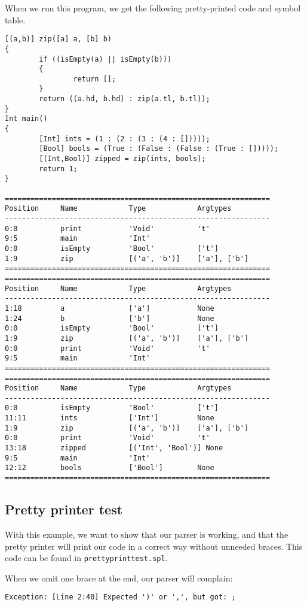 \documentclass[a4paper]{article}
\begin{document}
When we run this program, we get the following pretty-printed code and symbol table.
\begin{verbatim}
[(a,b)] zip([a] a, [b] b)
{
        if ((isEmpty(a) || isEmpty(b)))
        {
                return [];
        }
        return ((a.hd, b.hd) : zip(a.tl, b.tl));
}
Int main()
{
        [Int] ints = (1 : (2 : (3 : (4 : []))));
        [Bool] bools = (True : (False : (False : (True : []))));
        [(Int,Bool)] zipped = zip(ints, bools);
        return 1;
}

==============================================================
Position     Name            Type            Argtypes            
--------------------------------------------------------------
0:0          print           'Void'          't'                 
9:5          main            'Int'                               
0:0          isEmpty         'Bool'          ['t']               
1:9          zip             [('a', 'b')]    ['a'], ['b']        
==============================================================
==============================================================
Position     Name            Type            Argtypes            
--------------------------------------------------------------
1:18         a               ['a']           None                
1:24         b               ['b']           None                
0:0          isEmpty         'Bool'          ['t']               
1:9          zip             [('a', 'b')]    ['a'], ['b']        
0:0          print           'Void'          't'                 
9:5          main            'Int'                               
==============================================================
==============================================================
Position     Name            Type            Argtypes            
--------------------------------------------------------------
0:0          isEmpty         'Bool'          ['t']               
11:11        ints            ['Int']         None                
1:9          zip             [('a', 'b')]    ['a'], ['b']        
0:0          print           'Void'          't'                 
13:18        zipped          [('Int', 'Bool')] None                
9:5          main            'Int'                               
12:12        bools           ['Bool']        None                
==============================================================
\end{verbatim}

\subsection{Pretty printer test}
With this example, we want to show that our parser is working, and that the pretty printer will print our code in a correct way without unneeded braces. This code can be found in {\tt prettyprinttest.spl}.

When we omit one brace at the end, our parser will complain:
\begin{verbatim}
Exception: [Line 2:40] Expected ')' or ',', but got: ;
\end{verbatim}
\end{document}

